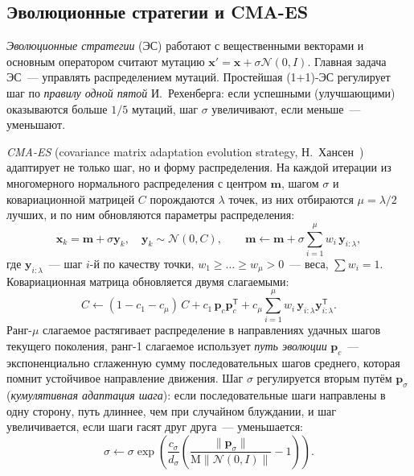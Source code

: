 \subsection{Эволюционные стратегии и CMA-ES}
\label{sec:cmaes}

\emph{Эволюционные стратегии} (ЭС) работают с вещественными векторами и основным оператором считают
мутацию $\mathbf{x}' = \mathbf{x} + \sigma\mathcal{N}(0, I)$. Главная задача ЭС~--- управлять
распределением мутаций. Простейшая (1+1)-ЭС регулирует шаг по \emph{правилу одной пятой}
И.~Рехенберга: если успешными (улучшающими) оказываются больше $1/5$ мутаций, шаг $\sigma$ увеличивают,
если меньше~--- уменьшают.

\emph{CMA-ES} (covariance matrix adaptation evolution strategy, Н.~Хансен~\cite{hansen2001, hansen2016})
адаптирует не только шаг, но и форму распределения. На каждой итерации из многомерного нормального
распределения с центром $\mathbf{m}$, шагом $\sigma$ и ковариационной матрицей $C$ порождаются $\lambda$
точек, из них отбираются $\mu = \lambda/2$ лучших, и по ним обновляются параметры распределения:
\begin{equation}
\label{eq:cma-sample}
\mathbf{x}_k = \mathbf{m} + \sigma\mathbf{y}_k, \quad \mathbf{y}_k \sim \mathcal{N}(0, C), \qquad
\mathbf{m} \leftarrow \mathbf{m} + \sigma\sum_{i=1}^{\mu} w_i\,\mathbf{y}_{i:\lambda},
\end{equation}
где $\mathbf{y}_{i:\lambda}$~--- шаг $i$-й по качеству точки, $w_1 \ge \ldots \ge w_\mu > 0$~--- веса,
$\sum w_i = 1$. Ковариационная матрица обновляется двумя слагаемыми:
\begin{equation}
\label{eq:cma-cov}
C \leftarrow (1 - c_1 - c_\mu)\,C + c_1\,\mathbf{p}_c\mathbf{p}_c^{\mathsf T}
+ c_\mu\sum_{i=1}^{\mu} w_i\,\mathbf{y}_{i:\lambda}\mathbf{y}_{i:\lambda}^{\mathsf T}.
\end{equation}
Ранг-$\mu$ слагаемое растягивает распределение в направлениях удачных шагов текущего поколения,
ранг-1 слагаемое использует \emph{путь эволюции} $\mathbf{p}_c$~--- экспоненциально сглаженную сумму
последовательных шагов среднего, которая помнит устойчивое направление движения. Шаг $\sigma$
регулируется вторым путём $\mathbf{p}_\sigma$ (\emph{кумулятивная адаптация шага}): если последовательные
шаги направлены в одну сторону, путь длиннее, чем при случайном блуждании, и шаг увеличивается, если
шаги гасят друг друга~--- уменьшается:
\begin{equation}
\label{eq:cma-sigma}
\sigma \leftarrow \sigma\exp\!\left(\frac{c_\sigma}{d_\sigma}\left(\frac{\lVert\mathbf{p}_\sigma\rVert}
{\mathrm{M}\lVert\mathcal{N}(0, I)\rVert} - 1\right)\right).
\end{equation}

